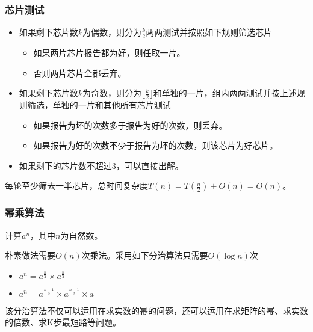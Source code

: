 \documentclass{ctexbeamer}
\begin{document}
    \begin{frame}
        \frametitle{芯片测试}

        \begin{itemize}
            \item 如果剩下芯片数$k$为偶数，则分为$\frac{k}{2}$两两测试并按照如下规则筛选芯片
                \begin{itemize}
                    \item 如果两片芯片报告都为好，则任取一片。
                    \item 否则两片芯片全都丢弃。
                \end{itemize}
            \item 如果剩下芯片数$k$为奇数，则分为$\lfloor \frac{k}{2} \rfloor$和单独的一片，组内两两测试并按上述规则筛选，单独的一片和其他所有芯片测试
                \begin{itemize}
                    \item 如果报告为坏的次数多于报告为好的次数，则丢弃。
                    \item 如果报告为好的次数不少于报告为坏的次数，则该芯片为好芯片。
                \end{itemize}
            \item 如果剩下的芯片数不超过$3$，可以直接出解。
        \end{itemize}

        每轮至少筛去一半芯片，总时间复杂度$T(n) = T(\frac{n}{2}) + O(n) = O(n)$。

    \end{frame}


    \begin{frame}
        \frametitle{幂乘算法}

        计算$a^n$，其中$n$为自然数。

        朴素做法需要$O(n)$次乘法。采用如下分治算法只需要$O(\log n)$次

        \begin{itemize}
            \item $a^n = a^{\frac{n}{2}} \times a^{\frac{n}{2}}$
            \item $a^n = a^{\frac{n-1}{2}} \times a^{\frac{n-1}{2}} \times a$
        \end{itemize}

        该分治算法不仅可以运用在求实数的幂的问题，还可以运用在求矩阵的幂、求实数的倍数、求K步最短路等问题。
        
    \end{frame}
\end{document}
